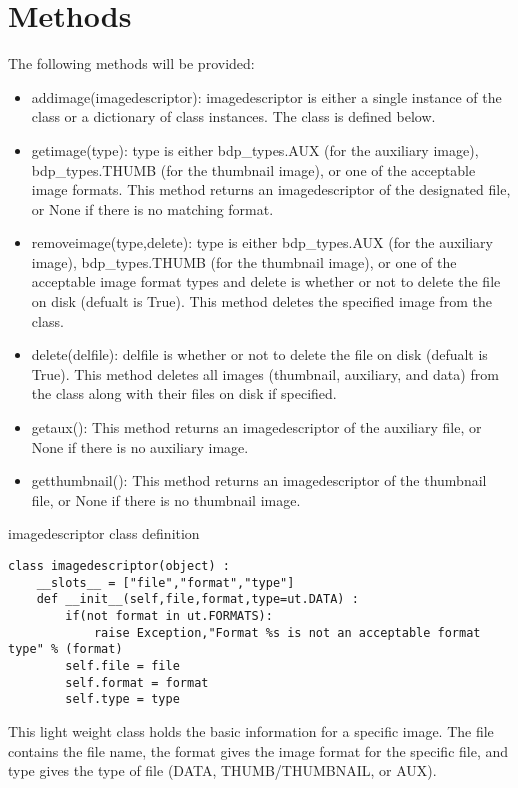 \documentclass[preprint]{aastex}
\begin{document}
\section{Methods}
The following methods will be provided:
\begin{itemize}
\item addimage(imagedescriptor): imagedescriptor is either a single instance of the class or a dictionary of class instances. The class is defined below.
\item getimage(type): type is either bdp\_types.AUX (for the auxiliary image), bdp\_types.THUMB (for the thumbnail image), or one of the acceptable image formats. This method returns an imagedescriptor of the designated file, or None if there is no matching format.
\item removeimage(type,delete): type is either bdp\_types.AUX (for the auxiliary image), bdp\_types.THUMB (for the thumbnail image), or one of the acceptable image format types and delete is whether or not to delete the file on disk (defualt is True). This method deletes the specified image from the class.
\item delete(delfile): delfile is whether or not to delete the file on disk (defualt is True). This method deletes all images (thumbnail, auxiliary, and data) from the class along with their files on disk if specified.
\item getaux(): This method returns an imagedescriptor of the auxiliary file, or None if there is no auxiliary image.
\item getthumbnail(): This method returns an imagedescriptor of the thumbnail file, or None if there is no thumbnail image.
\end{itemize}

\noindent imagedescriptor class definition
\begin{verbatim}
class imagedescriptor(object) :
    __slots__ = ["file","format","type"]
    def __init__(self,file,format,type=ut.DATA) :
        if(not format in ut.FORMATS):
            raise Exception,"Format %s is not an acceptable format type" % (format)
        self.file = file
        self.format = format
        self.type = type
\end{verbatim} 
This light weight class holds the basic information for a specific image. The file contains the file name, the format gives the image format for the specific file, and type gives the type of file (DATA, THUMB/THUMBNAIL, or AUX).
\end{document}
